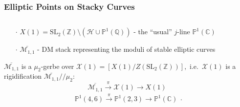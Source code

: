 \documentclass[handout]{beamer}
\numberwithin{equation}{section}
\numberwithin{case}{theorem}
\newcommand{\cH}{\mathcal{H}}		%
\newcommand{\cM}{\mathcal{M}}		%
\newcommand{\sX}{\mathscr{X}}		%
\newcommand{\bbC}{\mathbb{C}}		%
\newcommand{\bbP}{\mathbb{P}}		%
\newcommand{\bbQ}{\mathbb{Q}}		%
\newcommand{\bbZ}{\mathbb{Z}}		%
\newcommand{\SL}{\mathrm{SL}} 	%
\newcommand{\<}{\left\langle}
\renewcommand{\>}{\right\rangle}
\begin{document}
	\begin{frame}
		\frametitle{Elliptic Points on Stacky Curves}
		\begin{columns}
			\begin{column}{.5\textwidth}
				\begin{example}
					\begin{itemize}
						\item[$\cdot$] $X(1)=\SL_2(\bbZ)\setminus(\cH\cup\bbP^1(\bbQ))$ - the ``usual'' $j$-line $\bbP^1(\bbC)$ \pause
						\item[$\cdot$] $\overline{\cM_{1,1}}$ - DM stack representing the moduli of stable elliptic curves\pause
					\end{itemize}
					$\overline{\cM_{1,1}}$ is a $\mu_{2}$-gerbe over $\sX(1)=[X(1)/Z(\SL_2(\bbZ))],$ \pause i.e.\ $\sX(1)$ is a rigidification $\overline{\cM_{1,1}}/\!/\mu_{2}$: \pause
					\[\overline{\cM_{1,1}}\overset{\pi}{\to}\sX(1)\to X(1)\] \pause
					\[\begin{array}{ll}
						\bbP^1(4,6)\overset{\pi}{\to}\bbP^1(2,3)\to \bbP^1(\bbC)\end{array}.\]
				\end{example}
				

\end{column}
\end{columns}
\end{frame}
\end{document}
